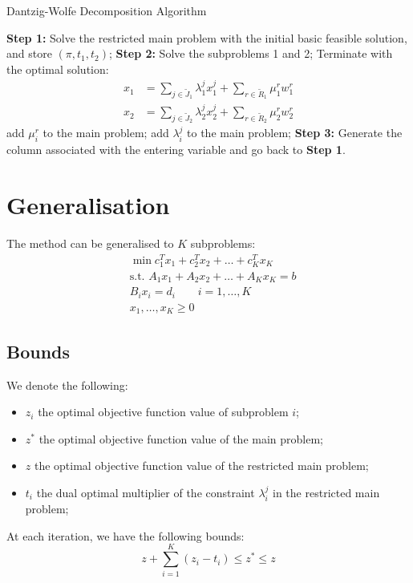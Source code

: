 \documentclass[12pt, openany]{report}
\theoremstyle{definition}
\begin{document}
\begin{algorithm}[H]
	\caption{Dantzig-Wolfe Decomposition Algorithm}
	\label{algo:dw}
	\begin{algorithmic}[1]
		\State \textbf{Step 1:} Solve the restricted main problem with the initial basic feasible solution, and store $(\pi,t_1,t_2)$;
		\State \textbf{Step 2:} Solve the subproblems 1 and 2;
		Terminate with the optimal solution:
		\begin{equation}
			\begin{aligned}
				x_1 &= \sum_{j\in \tilde J_1}\lambda_1^jx_1^j + \sum_{r\in \tilde R_1}\mu_1^r w_1^r\\
				x_2 &= \sum_{j\in \tilde J_2}\lambda_2^jx_2^j + \sum_{r\in \tilde R_2}\mu_2^r w_2^r
			\end{aligned}
		\end{equation}
		\EndIf
		 add $\mu_i^r$ to the main problem;
		\EndIf
		 add $\lambda_i^j$ to the main problem;\EndIf 
		\State \textbf{Step 3:} Generate the column associated with the entering variable and go back to \textbf{Step 1}.
	\end{algorithmic}
\end{algorithm}
\section{Generalisation}
The method can be generalised to $K$ subproblems:
\begin{equation}
	\begin{aligned}
		&\min c_1^T x_1 + c_2^Tx_2 + \dots + c_K^Tx_K\\
		&\text{s.t.  }A_1x_1 + A_2x_2 + \dots + A_Kx_K = b\\
		& B_i x_i = d_i \qquad i = 1,\dots,K\\
		& x_1,\dots,x_K\ge 0
	\end{aligned}
\end{equation}
\subsection{Bounds}
We denote the following:
\begin{itemize}
	\item $z_i$ the optimal objective function value of subproblem $i$;
	\item $z^*$ the optimal objective function value of the main problem;
	\item $z$ the optimal objective function value of the restricted main problem;
	\item $t_i$ the dual optimal multiplier of the constraint $\lambda_i^j$ in the restricted main problem;
\end{itemize}
At each iteration, we have the following bounds:
\begin{equation}
	z+\sum_{i=1}^K (z_i-t_i)\le z^* \le z 
\end{equation}
\end{document}
